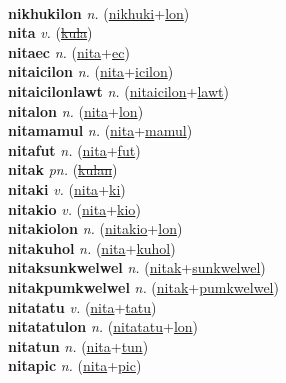  \label{nikhukiles} \\
\textbf{nikhukilon} \textit{n.} (\hyperref[nikhuki]{nikhuki}+\hyperref[lon]{lon})
 \label{nikhukilon} \\
\textbf{nita} \textit{v.} (\hyperref[kula]{\sout{kula}})
 \label{nita} \\
\textbf{nitaec} \textit{n.} (\hyperref[nita]{nita}+\hyperref[ec]{ec})
 \label{nitaec} \\
\textbf{nitaicilon} \textit{n.} (\hyperref[nita]{nita}+\hyperref[icilon]{icilon})
 \label{nitaicilon} \\
\textbf{nitaicilonlawt} \textit{n.} (\hyperref[nitaicilon]{nitaicilon}+\hyperref[lawt]{lawt})
 \label{nitaicilonlawt} \\
\textbf{nitalon} \textit{n.} (\hyperref[nita]{nita}+\hyperref[lon]{lon})
 \label{nitalon} \\
\textbf{nitamamul} \textit{n.} (\hyperref[nita]{nita}+\hyperref[mamul]{mamul})
 \label{nitamamul} \\
\textbf{nitafut} \textit{n.} (\hyperref[nita]{nita}+\hyperref[fut]{fut})
 \label{nitafut} \\
\textbf{nitak} \textit{pn.} (\hyperref[kulan]{\sout{kulan}})
 \label{nitak} \\
\textbf{nitaki} \textit{v.} (\hyperref[nita]{nita}+\hyperref[ki]{ki})
 \label{nitaki} \\
\textbf{nitakio} \textit{v.} (\hyperref[nita]{nita}+\hyperref[kio]{kio})
 \label{nitakio} \\
\textbf{nitakiolon} \textit{n.} (\hyperref[nitakio]{nitakio}+\hyperref[lon]{lon})
 \label{nitakiolon} \\
\textbf{nitakuhol} \textit{n.} (\hyperref[nita]{nita}+\hyperref[kuhol]{kuhol})
 \label{nitakuhol} \\
\textbf{nitaksunkwelwel} \textit{n.} (\hyperref[nitak]{nitak}+\hyperref[sunkwelwel]{sunkwelwel})
 \label{nitaksunkwelwel} \\
\textbf{nitakpumkwelwel} \textit{n.} (\hyperref[nitak]{nitak}+\hyperref[pumkwelwel]{pumkwelwel})
 \label{nitakpumkwelwel} \\
\textbf{nitatatu} \textit{v.} (\hyperref[nita]{nita}+\hyperref[tatu]{tatu})
 \label{nitatatu} \\
\textbf{nitatatulon} \textit{n.} (\hyperref[nitatatu]{nitatatu}+\hyperref[lon]{lon})
 \label{nitatatulon} \\
\textbf{nitatun} \textit{n.} (\hyperref[nita]{nita}+\hyperref[tun]{tun})
 \label{nitatun} \\
\textbf{nitapic} \textit{n.} (\hyperref[nita]{nita}+\hyperref[pic]{pic})

